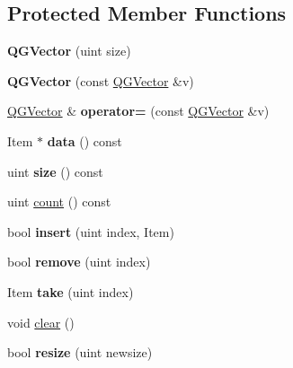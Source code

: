 \subsection*{Protected Member Functions}
\begin{DoxyCompactItemize}
\item 
\mbox{\label{class_q_g_vector_a13dcf494445ce742cb6e71fe5cf1b747}} 
{\bfseries Q\+G\+Vector} (uint size)
\item 
\mbox{\label{class_q_g_vector_aabb624cce7dbdbcc63335f25e089228a}} 
{\bfseries Q\+G\+Vector} (const \mbox{\hyperlink{class_q_g_vector}{Q\+G\+Vector}} \&v)
\item 
\mbox{\label{class_q_g_vector_a460c0560413d93cf0e51f0a01b64b5ef}} 
\mbox{\hyperlink{class_q_g_vector}{Q\+G\+Vector}} \& {\bfseries operator=} (const \mbox{\hyperlink{class_q_g_vector}{Q\+G\+Vector}} \&v)
\item 
\mbox{\label{class_q_g_vector_ab74c24a97f56844d61408fd90ddd9314}} 
Item $\ast$ {\bfseries data} () const
\item 
\mbox{\label{class_q_g_vector_a1c004fbe24a98b7656e3913a17ae6ed7}} 
uint {\bfseries size} () const
\item 
uint \mbox{\hyperlink{class_q_g_vector_a24cdcea0593a3c9334d130e66c8e2043}{count}} () const
\item 
\mbox{\label{class_q_g_vector_a1c047eefbab23bd18ac724d7bf31f7eb}} 
bool {\bfseries insert} (uint index, Item)
\item 
\mbox{\label{class_q_g_vector_ac2192d68c03bbf2b79100fb260bf2e94}} 
bool {\bfseries remove} (uint index)
\item 
\mbox{\label{class_q_g_vector_a3b47c58132f741705a4c1b86dccbbef5}} 
Item {\bfseries take} (uint index)
\item 
void \mbox{\hyperlink{class_q_g_vector_aefe0a7fe991a79788cc3317eb3e5daa1}{clear}} ()
\item 
\mbox{\label{class_q_g_vector_a101a62984a6e013ef2b1f210cb848dca}} 
bool {\bfseries resize} (uint newsize)

\end{DoxyCompactItemize}
